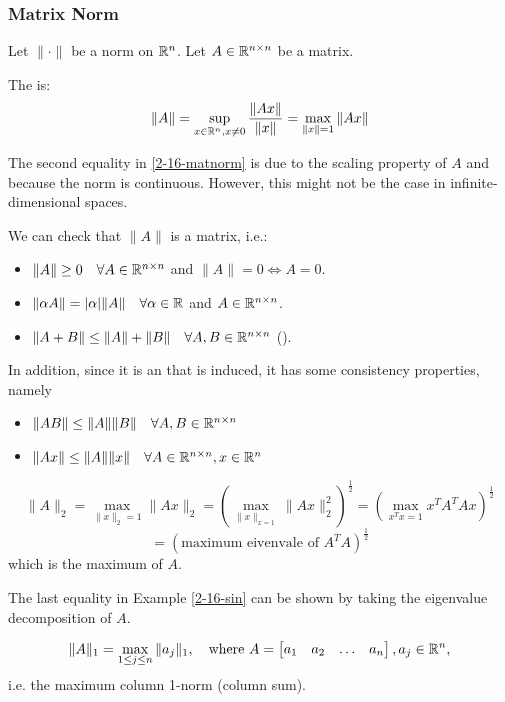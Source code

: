 \documentclass[../main/main.tex]{subfiles}
\begin{document}
\subsubsection{Matrix Norm}
Let $\|\cdot\|$ be a norm on $\mathbb{R}^{n}$. Let $A\in\mathbb{R}^{n \times n}$ be a matrix.
\begin{definition}
  \label{2-16-matnorm}
  The  is: \[
\|A\| = \sup_{x\in\mathbb{R}^{n}, x\neq 0}\frac{\|Ax\|}{\|x\|} = \max_{\|x\|=1}\|Ax\|
  \]
\end{definition}
\begin{remark}
The second equality in \ref{2-16-matnorm} is due to the scaling property of $A$ and because the norm is continuous. However, this might not be the case in infinite-dimensional spaces.
\end{remark}
We can check that $\|A\|$ is a matrix, i.e.:
\begin{itemize}
    \item $\| A\| \geq 0\quad \forall A \in\mathbb{R}^{n \times n}$ and $\|A\|= 0 \iff A = 0$.
    \item $\|\alpha A\|= |\alpha| \|A\| \quad \forall \alpha \in\mathbb{R}$ and $A \in\mathbb{R}^{n \times n}$.
          \item $\|A+B\| \leq \|A\|+ \|B\| \quad \forall A,B\in\mathbb{R}^{n\times n}$ ().
\end{itemize}
In addition, since it is an  that is induced, it has some consistency properties, namely
\begin{itemize}
\item $\|AB\| \leq \|A\| \|B\|\quad \forall A,B \in\mathbb{R}^{n\times n}$
        \item $\|Ax\|\leq \|A\|\|x\|\quad \forall A \in\mathbb{R}^{n\times n}, x\in\mathbb{R}^{n}$
\end{itemize}
\begin{example} \[
\| A\|_{2} = \max_{\|x\|_{2}=1} \|Ax\|_{2} = \left(\max_{\|x\|_{x=1}}\|Ax\|_{2}^{2}\right)^{ \frac{1}{2} } = \left(\max_{x^{T}x=1}x^{T}A^{T}Ax\right)^{\frac{1}{2}}
\] \[
 = (\text{maximum eivenvale of }A^{T}A)^{\frac{1}{2}}
\]which is the maximum  of $A$.
  \label{2-16-sin}
\end{example}
\begin{remark}
The last equality in Example \ref{2-16-sin} can be shown by taking the eigenvalue decomposition of $A$.
\end{remark}
\begin{theorem}
  \[
    \|A\|_{1}= \max_{1\leq j \leq n}\|a_{j}\|_{1}, \quad\text{where }A = \begin{bmatrix}
a_1 &a_2&\ldots&a_{n}
    \end{bmatrix} , a_{j}\in\mathbb{R}^{n}
 , \] i.e. the maximum column 1-norm (column sum).
\end{theorem}
\end{document}
